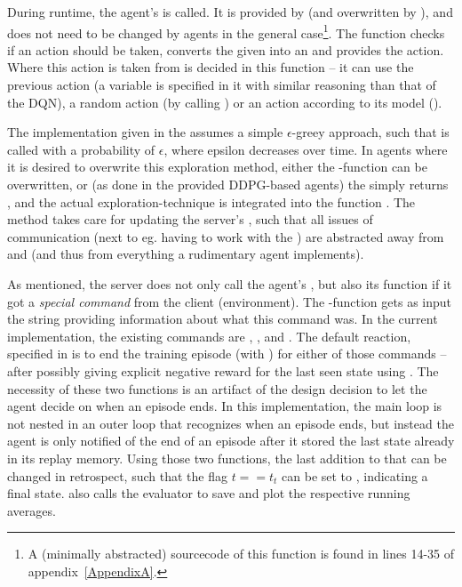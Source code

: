 During runtime, the agent's  is called. It is provided by  (and overwritten by ), and does not need to be changed by agents in the general case\footnote{A (minimally abstracted) sourcecode of this function is found in lines 14-35 of appendix~\ref{AppendixA}.}. The function checks if an action should be taken, converts the given  into an  and provides the action. Where this action is taken from is decided in this function -- it can use the previous action (a variable  is specified in it with similar reasoning than that of the DQN\cite{mnih_human-level_2015}), a random action (by calling ) or an action according to its model ().

The implementation given in the  assumes a simple $\epsilon$-greey approach, such that  is called with a probability of $\epsilon$, where epsilon decreases over time. In agents where it is desired to overwrite this exploration method, either the -function can be overwritten, or (as done in the provided DDPG-based agents) the  simply returns , and the actual exploration-technique is integrated into the function . 
The method  takes care for updating the server's , such that all issues of communication (next to eg. having to work with the ) are abstracted away from  and  (and thus from everything a rudimentary agent implements). 

As mentioned, the server does not only call the agent's , but also its function  if it got a \textit{special command} from the client (environment). The -function gets as input the string providing information about what this command was. In the current implementation, the existing commands are , ,  and  . The default reaction, specified in  is to end the training episode (with ) for either of those commands -- after possibly giving explicit negative reward for the last seen state using . The necessity of these two functions is an artifact of the design decision to let the agent decide on when an episode ends. In this implementation, the main loop is not nested in an outer loop that recognizes when an episode ends, but instead the agent is only notified of the end of an episode after it stored the last state already in its replay memory. Using those two functions, the last addition to that can be changed in retrospect, such that the flag $t == t_t$ can be set to , indicating a final state.  also calls the evaluator to save and plot the respective running averages.


